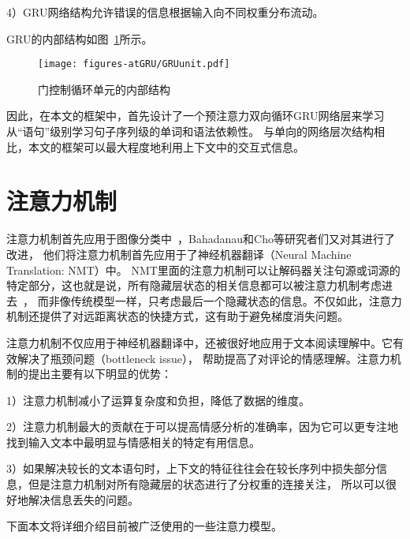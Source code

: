 4）GRU网络结构允许错误的信息根据输入向不同权重分布流动。

GRU的内部结构如图~\ref{fig:GRUunit}所示。
\begin{figure}[h!]
	\centering
	\texttt{[image: figures-atGRU/GRUunit.pdf]}
	\caption{门控制循环单元的内部结构}
	\label{fig:GRUunit}
\end{figure}

因此，在本文的框架中，首先设计了一个预注意力双向循环GRU网络层来学习从“语句”级别学习句子序列级的单词和语法依赖性。
与单向的网络层次结构相比，本文的框架可以最大程度地利用上下文中的交互式信息。

\section{注意力机制}
注意力机制首先应用于图像分类中~，Bahadanau和Cho等研究者们又对其进行了改进，
他们将注意力机制首先应用于了神经机器翻译（Neural Machine Translation: NMT）中。
NMT里面的注意力机制可以让解码器关注句源或词源的特定部分，这也就是说，所有隐藏层状态的相关信息都可以被注意力机制考虑进去~，
而非像传统模型一样，只考虑最后一个隐藏状态的信息。不仅如此，注意力机制还提供了对远距离状态的快捷方式，这有助于避免梯度消失问题。

注意力机制不仅应用于神经机器翻译中，还被很好地应用于文本阅读理解中。它有效解决了瓶颈问题（bottleneck issue），
帮助提高了对评论的情感理解。注意力机制的提出主要有以下明显的优势：

1）注意力机制减小了运算复杂度和负担，降低了数据的维度。

2）注意力机制最大的贡献在于可以提高情感分析的准确率，因为它可以更专注地找到输入文本中最明显与情感相关的特定有用信息。

3）如果解决较长的文本语句时，上下文的特征往往会在较长序列中损失部分信息，但是注意力机制对所有隐藏层的状态进行了分权重的连接关注，
所以可以很好地解决信息丢失的问题。

下面本文将详细介绍目前被广泛使用的一些注意力模型。

